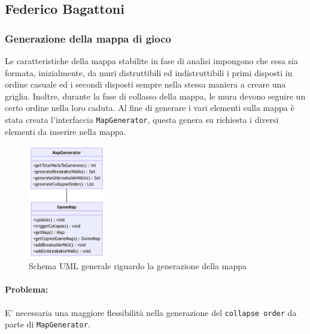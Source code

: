 \documentclass[a4paper,12pt]{report}
\begin{document}
\subsection{Federico Bagattoni}

\subsubsection{Generazione della mappa di gioco}\label{map-generator-subsection}
\par
Le caratteristiche della mappa stabilite in fase di analisi impongono che essa sia formata, inizialmente, da muri distruttibili ed indistruttibili i primi disposti in ordine casuale ed i secondi disposti sempre nella stessa maniera a creare una griglia. 
%
Inoltre, durante la fase di collasso della mappa, le mura devono seguire un certo ordine nella loro caduta. 
\newline
Al fine di generare i vari elementi sulla mappa è stata creata l'interfaccia \verb|MapGenerator|, questa genera su richiesta i diversi elementi da inserire nella mappa.
%
\begin{figure}[H]
    \centering{}
    \includegraphics[width=0.3\textwidth]{img/mapgenerator-gamemap.png}
    \caption{Schema UML generale riguardo la generazione della mappa}
    \label{img:mapgenerator-gamemap}
\end{figure}
%
\paragraph{Problema:} E' necessaria una maggiore flessibilità nella generazione del \verb|collapse order| da parte di \verb|MapGenerator|.
%
\end{document}
